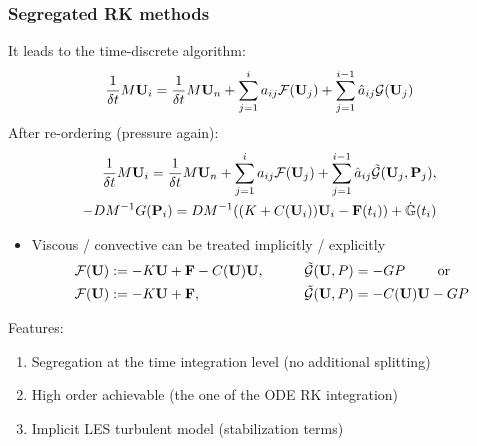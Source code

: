 \begin{frame}
\frametitle{Segregated RK methods}
It leads to the time-discrete algorithm:
\begin{align*}
\frac{1}{\delta t}M{\bf U}_i=\frac{1}{\delta t}M{\bf U}_n+\sum_{j=1}^ia_{ij}\mathcal{F}({\bf U}_j)+\sum_{j=1}^{i-1}\hat{a}_{ij}\mathcal{G}({\bf U}_j)
\end{align*}
After re-ordering (pressure again):
\begin{align*}
\frac{1}{\delta t}M{\bf U}_i=\frac{1}{\delta t}M{\bf U}_n+\sum_{j=1}^ia_{ij}\mathcal{F}({\bf U}_j)+\sum_{j=1}^{i-1}\hat{a}_{ij}  \tilde{\mathcal{G}}({\bf U}_j,{\bf P}_j),\\
- DM^{-1}G ({\bf P}_i)=DM^{-1}((K+C({\bf U}_i)){\bf U}_i - {\bf F}(t_i)) +\dot{\mathbb{G}}(t_i)
\end{align*}
\begin{overprint}
\begin{itemize}
\item Viscous / convective can be treated implicitly / explicitly
\begin{align*}
&\mathcal{F}({\bf U}) :=-K{\bf U} + {\bf F} - C({\bf U}){\bf U}, \qquad &&\tilde{\mathcal{G}}({\bf U},P) = -G P \qquad 
\hbox{ or } \\
&\mathcal{F}({\bf U}) :=-K{\bf U} + {\bf F},  \qquad && \tilde{\mathcal{G}}({\bf U},P) = - C({\bf U}){\bf U} - G P
\end{align*}
\end{itemize}
Features:
\begin{enumerate}
\item Segregation at the time integration level (no additional splitting)
\item High order achievable (the one of the ODE RK integration)
\item Implicit LES turbulent model (stabilization terms)
\end{enumerate}
\end{overprint}
\end{frame}

